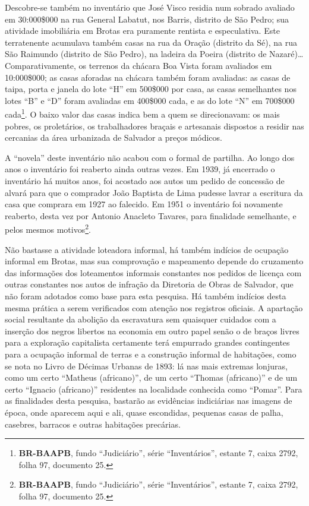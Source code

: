 Descobre-se também no inventário que José Visco residia num sobrado avaliado em 30:000\$000 na rua General Labatut, nos Barris, distrito de São Pedro; sua atividade imobiliária em Brotas era puramente rentista e especulativa. Este terratenente acumulava também casas na rua da Oração (distrito da Sé), na rua São Raimundo (distrito de São Pedro), na ladeira da Poeira (distrito de Nazaré)\dots Comparativamente, os terrenos da chácara Boa Vista foram avaliados em 10:000\$000; as casas aforadas na chácara também foram avaliadas: as casas de taipa, porta e janela do lote ``H'' em 500\$000 por casa, as casas semelhantes nos lotes ``B'' e ``D'' foram avaliadas em 400\$000 cada, e as do lote ``N'' em 700\$000 cada\footnote{\textbf{BR-BAAPB}, fundo ``Judiciário'', série ``Inventários'', estante 7, caixa 2792, folha 97, documento 25.}. O baixo valor das casas indica bem a quem se direcionavam: os mais pobres, os proletários, os trabalhadores braçais e artesanais dispostos a residir nas cercanias da área urbanizada de Salvador a preços módicos.

A ``novela'' deste inventário não acabou com o formal de partilha. Ao longo dos anos o inventário foi reaberto ainda outras vezes. Em 1939, já encerrado o inventário há muitos anos, foi acostado aos autos um pedido de concessão de alvará para que o comprador João Baptista de Lima pudesse lavrar a escritura da casa que comprara em 1927 ao falecido. Em 1951 o inventário foi novamente reaberto, desta vez por Antonio Anacleto Tavares, para finalidade semelhante, e pelos mesmos motivos\footnote{\textbf{BR-BAAPB}, fundo ``Judiciário'', série ``Inventários'', estante 7, caixa 2792, folha 97, documento 25.}.

Não bastasse a atividade loteadora informal, há também indícios de ocupação informal em Brotas, mas sua comprovação e mapeamento depende do cruzamento das informações dos loteamentos informais constantes nos pedidos de licença com outras constantes nos autos de infração da Diretoria de Obras de Salvador, que não foram adotados como base para esta pesquisa. Há também indícios desta mesma prática a serem verificados com atenção nos registros oficiais. A apartação social resultante da abolição da escravatura sem quaisquer cuidados com a inserção dos negros libertos na economia em outro papel senão o de braços livres para a exploração capitalista certamente terá empurrado grandes contingentes para a ocupação informal de terras e a construção informal de habitações, como se nota no Livro de Décimas Urbanas de 1893: lá nas mais extremas lonjuras, como um certo ``Matheus (africano)'', de um certo ``Thomas (africano)'' e de um certo ``Ignacio (africano)'' residentes na localidade conhecida como ``Pomar''. Para as finalidades desta pesquisa, bastarão as evidências indiciárias nas imagens de época, onde aparecem aqui e ali, quase escondidas, pequenas casas de palha, casebres, barracos e outras habitações precárias.

